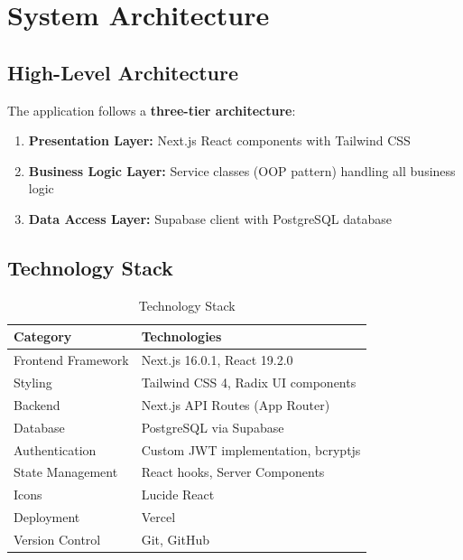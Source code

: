 \documentclass[12pt,a4paper]{article}
\begin{document}
\section{System Architecture}

\subsection{High-Level Architecture}

The application follows a \textbf{three-tier architecture}:

\begin{enumerate}[noitemsep]
    \item \textbf{Presentation Layer:} Next.js React components with Tailwind CSS
    \item \textbf{Business Logic Layer:} Service classes (OOP pattern) handling all business logic
    \item \textbf{Data Access Layer:} Supabase client with PostgreSQL database
\end{enumerate}

\subsection{Technology Stack}

\begin{table}[H]
\centering
\begin{tabularx}{\textwidth}{|l|X|}
\hline
\textbf{Category} & \textbf{Technologies} \\
\hline
Frontend Framework & Next.js 16.0.1, React 19.2.0 \\
\hline
Styling & Tailwind CSS 4, Radix UI components \\
\hline
Backend & Next.js API Routes (App Router) \\
\hline
Database & PostgreSQL via Supabase \\
\hline
Authentication & Custom JWT implementation, bcryptjs \\
\hline
State Management & React hooks, Server Components \\
\hline
Icons & Lucide React \\
\hline
Deployment & Vercel \\
\hline
Version Control & Git, GitHub \\
\hline
\end{tabularx}
\caption{Technology Stack}
\end{table}
\end{document}
